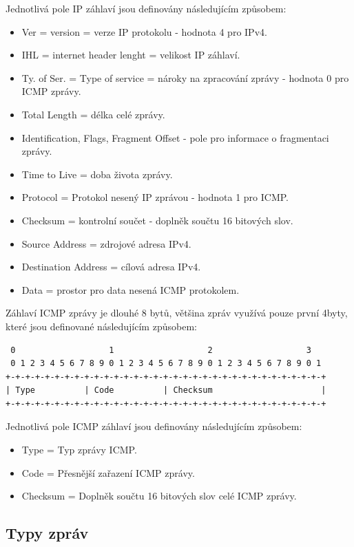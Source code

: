 \documentclass[12pt, a4paper]{article}
\begin{document}
Jednotlivá pole IP záhlaví jsou definovány následujícím způsobem:

\begin{itemize}
\item Ver = version = verze IP protokolu - hodnota 4 pro IPv4.
\item IHL = internet header lenght = velikost IP záhlaví.
\item Ty. of Ser. = Type of service = nároky na zpracování zprávy - hodnota 0 pro ICMP zprávy.
\item Total Length = délka celé zprávy.
\item Identification, Flags, Fragment Offset - pole pro informace o fragmentaci zprávy.
\item Time to Live = doba života zprávy.
\item Protocol = Protokol nesený IP zprávou - hodnota 1 pro ICMP.
\item Checksum = kontrolní součet - doplněk součtu 16 bitových slov.
\item Source Address = zdrojové adresa IPv4.
\item Destination Address = cílová adresa IPv4.
\item Data = prostor pro data nesená ICMP protokolem.
\end{itemize}

Záhlaví ICMP zprávy je dlouhé 8 bytů, většina zpráv využívá pouze první 4byty, které jsou definované následujícím způsobem:

\begin{verbatim}
 0                   1                   2                   3
 0 1 2 3 4 5 6 7 8 9 0 1 2 3 4 5 6 7 8 9 0 1 2 3 4 5 6 7 8 9 0 1
+-+-+-+-+-+-+-+-+-+-+-+-+-+-+-+-+-+-+-+-+-+-+-+-+-+-+-+-+-+-+-+-+
| Type          | Code          | Checksum                      |
+-+-+-+-+-+-+-+-+-+-+-+-+-+-+-+-+-+-+-+-+-+-+-+-+-+-+-+-+-+-+-+-+
\end{verbatim} 

Jednotlivá pole ICMP záhlaví jsou definovány následujícím způsobem:

\begin{itemize}
\item Type = Typ zprávy ICMP.
\item Code = Přesnější zařazení ICMP zprávy.
\item Checksum = Doplněk součtu 16 bitových slov celé ICMP zprávy.
\end{itemize}

\subsection{Typy zpráv}
\end{document}
